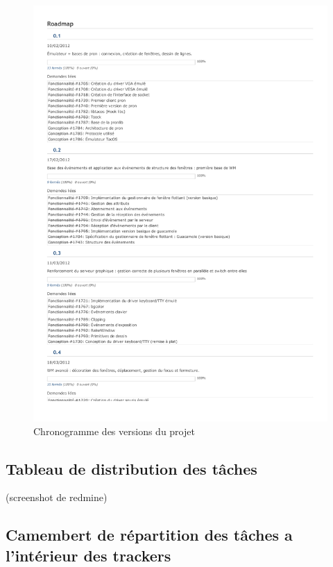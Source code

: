 \begin{figure}[H]
  \centering
    \includegraphics{roadmap}
  \caption{Chronogramme des versions du projet}
  \label{fig:diagGant}
\end{figure}

\subsection{Tableau de distribution des tâches}
(screenshot de redmine)
\subsection{Camembert de répartition des tâches a l'intérieur des trackers}
